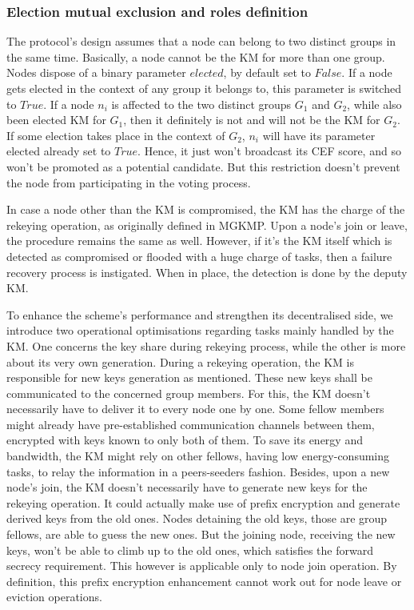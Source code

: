 \subsubsection{Election mutual exclusion and roles definition}

The protocol’s design assumes that a node can belong to two distinct groups in the same time. Basically, a node cannot be the KM for more than one group. Nodes dispose of a binary parameter $elected$, by default set to $False$. If a node gets elected in the context of any group it belongs to, this parameter is switched to $True$. If a node $n_i$ is affected to the two distinct groups $G_1$ and $G_2$, while also been elected KM for $G_1$, then it definitely is not and will not be the KM for $G_2$. If some election takes place in the context of $G_2$, $n_i$ will have its parameter elected already set to $True$. Hence, it just won’t broadcast its CEF score, and so won’t be promoted as a potential candidate. But this restriction doesn’t prevent the node from participating in the voting process.

In case a node other than the KM is compromised, the KM has the charge of the rekeying operation, as originally defined in MGKMP. Upon a node’s join or leave, the procedure remains the same as well. However, if it’s the KM itself which is detected as compromised or flooded with a huge charge of tasks, then a failure recovery process is instigated. When in place, the detection is done by the deputy KM.

To enhance the scheme’s performance and strengthen its decentralised side, we introduce two operational optimisations regarding tasks mainly handled by the KM. One concerns the key share during rekeying process, while the other is more about its very own generation. During a rekeying operation, the KM is responsible for new keys generation as mentioned. These new keys shall be communicated to the concerned group members. For this, the KM doesn’t necessarily have to deliver it to every node one by one. Some fellow members might already have pre-established communication channels between them, encrypted with keys known to only both of them. To save its energy and bandwidth, the KM might rely on other fellows, having low energy-consuming tasks, to relay the information in a peers-seeders fashion. Besides, upon a new node’s join, the KM doesn’t necessarily have to generate new keys for the rekeying operation. It could actually make use of prefix encryption and generate derived keys from the old ones. Nodes detaining the old keys, those are group fellows, are able to guess the new ones. But the joining node, receiving the new keys, won’t be able to climb up to the old ones, which satisfies the forward secrecy requirement. This however is applicable only to node join operation. By definition, this prefix encryption enhancement cannot work out for node leave or eviction operations.


